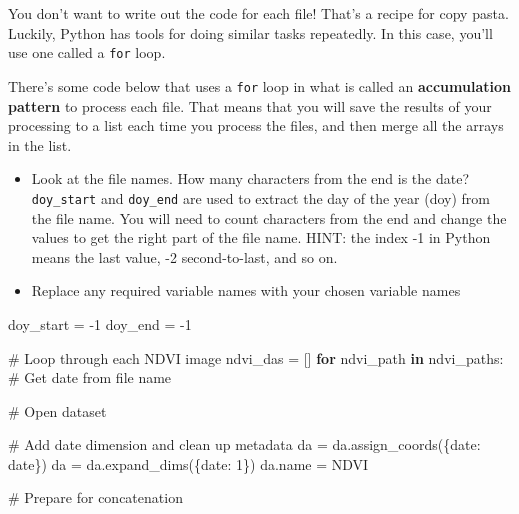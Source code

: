 \documentclass[
  letterpaper,
  DIV=11,
  numbers=noendperiod,
  oneside]{scrreprt}
\newenvironment{Shaded}{\begin{snugshade}}{\end{snugshade}}
\newcommand{\CommentTok}[1]{\textcolor[rgb]{0.37,0.37,0.37}{#1}}
\newcommand{\ControlFlowTok}[1]{\textcolor[rgb]{0.00,0.23,0.31}{\textbf{#1}}}
\newcommand{\DecValTok}[1]{\textcolor[rgb]{0.68,0.00,0.00}{#1}}
\newcommand{\KeywordTok}[1]{\textcolor[rgb]{0.00,0.23,0.31}{\textbf{#1}}}
\newcommand{\NormalTok}[1]{\textcolor[rgb]{0.00,0.23,0.31}{#1}}
\newcommand{\OperatorTok}[1]{\textcolor[rgb]{0.37,0.37,0.37}{#1}}
\newcommand{\StringTok}[1]{\textcolor[rgb]{0.13,0.47,0.30}{#1}}
\providecommand{\tightlist}{%
  \setlength{\itemsep}{0pt}\setlength{\parskip}{0pt}}
\begin{document}
You don't want to write out the code for each file! That's a recipe for
copy pasta. Luckily, Python has tools for doing similar tasks
repeatedly. In this case, you'll use one called a \texttt{for} loop.

There's some code below that uses a \texttt{for} loop in what is called
an \textbf{accumulation pattern} to process each file. That means that
you will save the results of your processing to a list each time you
process the files, and then merge all the arrays in the list.

\begin{tcolorbox}[enhanced jigsaw, colbacktitle=quarto-callout-color!10!white, opacityback=0, bottomtitle=1mm, toptitle=1mm, bottomrule=.15mm, left=2mm, colframe=quarto-callout-color-frame, leftrule=.75mm, opacitybacktitle=0.6, colback=white, rightrule=.15mm, toprule=.15mm, breakable, titlerule=0mm, title=\textcolor{quarto-callout-color}{\faInfo}\hspace{0.5em}{Try It}, coltitle=black, arc=.35mm]

\begin{itemize}
\tightlist
\item
  Look at the file names. How many characters from the end is the date?
  \texttt{doy\_start} and \texttt{doy\_end} are used to extract the day
  of the year (doy) from the file name. You will need to count
  characters from the end and change the values to get the right part of
  the file name. HINT: the index -1 in Python means the last value, -2
  second-to-last, and so on.
\item
  Replace any required variable names with your chosen variable names
\end{itemize}

\end{tcolorbox}

\begin{Shaded}
\begin{Highlighting}[]
\NormalTok{doy\_start }\OperatorTok{=} \OperatorTok{{-}}\DecValTok{1}
\NormalTok{doy\_end }\OperatorTok{=} \OperatorTok{{-}}\DecValTok{1}

\CommentTok{\# Loop through each NDVI image}
\NormalTok{ndvi\_das }\OperatorTok{=}\NormalTok{ []}
\ControlFlowTok{for}\NormalTok{ ndvi\_path }\KeywordTok{in}\NormalTok{ ndvi\_paths:}
    \CommentTok{\# Get date from file name}

    \CommentTok{\# Open dataset}

    \CommentTok{\# Add date dimension and clean up metadata}
\NormalTok{    da }\OperatorTok{=}\NormalTok{ da.assign\_coords(\{}\StringTok{\textquotesingle{}date\textquotesingle{}}\NormalTok{: date\})}
\NormalTok{    da }\OperatorTok{=}\NormalTok{ da.expand\_dims(\{}\StringTok{\textquotesingle{}date\textquotesingle{}}\NormalTok{: }\DecValTok{1}\NormalTok{\})}
\NormalTok{    da.name }\OperatorTok{=} \StringTok{\textquotesingle{}NDVI\textquotesingle{}}

    \CommentTok{\# Prepare for concatenation}
\end{Highlighting}
\end{Shaded}
\end{document}
